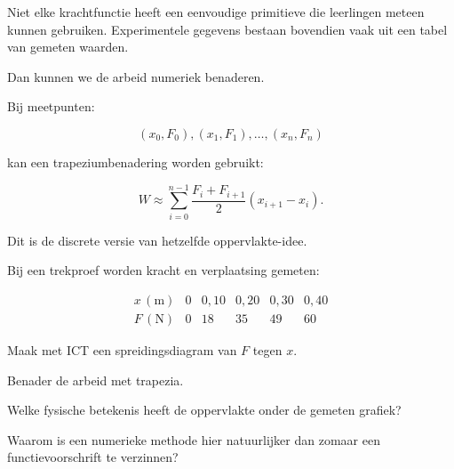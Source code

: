 \documentclass{ximera}
\begin{document}

Niet elke krachtfunctie heeft een eenvoudige primitieve die leerlingen meteen
kunnen gebruiken. Experimentele gegevens bestaan bovendien vaak uit een tabel
van gemeten waarden.

Dan kunnen we de arbeid numeriek benaderen.

Bij meetpunten:

\[
(x_0,F_0),(x_1,F_1),\ldots,(x_n,F_n)
\]

kan een trapeziumbenadering worden gebruikt:

\[
\boxed{
W\approx
\sum_{i=0}^{n-1}
\frac{F_i+F_{i+1}}{2}(x_{i+1}-x_i).
}
\]

Dit is de discrete versie van hetzelfde oppervlakte-idee.


\begin{oefening}{\oefU}

Bij een trekproef worden kracht en verplaatsing gemeten:

\[
\begin{array}{c|ccccc}
x\,(\mathrm m)&0&0{,}10&0{,}20&0{,}30&0{,}40\\ \hline
F\,(\mathrm N)&0&18&35&49&60
\end{array}
\]

\begin{question}
Maak met ICT een spreidingsdiagram van $F$ tegen $x$.
\end{question}

\begin{question}
Benader de arbeid met trapezia.
\end{question}

\begin{question}
Welke fysische betekenis heeft de oppervlakte onder de gemeten grafiek?
\end{question}

\begin{question}
Waarom is een numerieke methode hier natuurlijker dan zomaar een
functievoorschrift te verzinnen?
\end{question}

\end{oefening}


\end{document}
